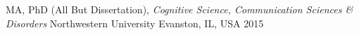 
\vspace{0.5mm}
\begin{cventries}

  \cventry
    {MA, PhD (All But Dissertation), \textit{Cognitive Science, Communication Sciences \& Disorders}} %
    {Northwestern University} %
    {Evanston, IL, USA} %
    {2015} %
    {
    }


\end{cventries}
